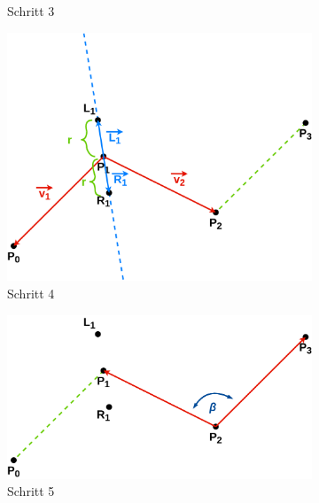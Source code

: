 \documentclass[doktyp=studarbeit]{TUBAFarbeiten}
\begin{document}
\begin{figure}[!htb]
\begin{subfigure}[b]{0.45\textwidth}
        \caption{Schritt 3}
    \end{subfigure}
    \qquad
    \begin{subfigure}[b]{0.45\textwidth}
        \centering
        \includegraphics[width=1\linewidth]{Schlangenlinie-4.png}
        \caption{Schritt 4}
    \end{subfigure}
    \qquad
    \begin{subfigure}[b]{0.45\textwidth}
        \centering
        \includegraphics[width=1\linewidth]{Schlangenlinie-5.png}
        \caption{Schritt 5}
    \end{subfigure}
    \qquad
    \begin{subfigure}[b]{0.45\textwidth}
        \centering

\end{subfigure}
\end{figure}
\end{document}
